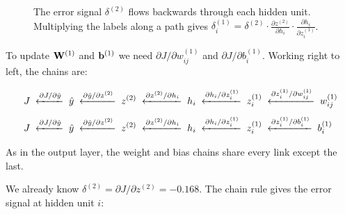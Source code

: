 \documentclass[12pt, a4paper]{article}
\begin{document}
\begin{figure}[H]
  \caption{The error signal $\delta^{(2)}$ flows backwards through each
    hidden unit.  Multiplying the labels along a path gives
    $\delta^{(1)}_i = \delta^{(2)} \cdot \frac{\partial z^{(2)}}{\partial h_i}
      \cdot \frac{\partial h_i}{\partial z^{(1)}_i}$.}
  \label{fig:hidden-chain}
\end{figure}

To update $\mathbf{W}^{(1)}$ and $\mathbf{b}^{(1)}$ we need
$\partial J / \partial w^{(1)}_{ij}$ and $\partial J / \partial b^{(1)}_i$.
Working right to left, the chains are:

\begin{align*}
  J \;\xleftarrow{\partial J/\partial \hat{y}}\;
  \hat{y} \;\xleftarrow{\partial \hat{y}/\partial z^{(2)}}\;
  z^{(2)} \;\xleftarrow{\partial z^{(2)}/\partial h_i}\;
  h_i \;\xleftarrow{\partial h_i/\partial z^{(1)}_i}\;
  z^{(1)}_i & \;\xleftarrow{\partial z^{(1)}_i/\partial w^{(1)}_{ij}}\;
  w^{(1)}_{ij}                                                          \\[0.4em]
  J \;\xleftarrow{\partial J/\partial \hat{y}}\;
  \hat{y} \;\xleftarrow{\partial \hat{y}/\partial z^{(2)}}\;
  z^{(2)} \;\xleftarrow{\partial z^{(2)}/\partial h_i}\;
  h_i \;\xleftarrow{\partial h_i/\partial z^{(1)}_i}\;
  z^{(1)}_i & \;\xleftarrow{\partial z^{(1)}_i/\partial b^{(1)}_i}\;
  b^{(1)}_i
\end{align*}

As in the output layer, the weight and bias chains share every link except
the last.

We already know $\delta^{(2)} = \partial J / \partial z^{(2)} = -0.168$.
The chain rule gives the error signal at hidden unit $i$:
\end{document}
